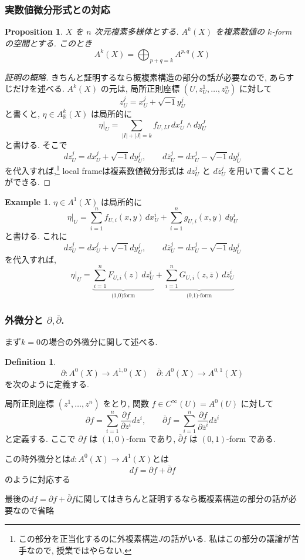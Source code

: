 \documentclass[dvipdfmx,a4paper,11pt]{article} %
\newtheorem{prop}[thm]{Proposition}
\theoremstyle{definition}
\newtheorem{defn}[thm]{Definition}
\newtheorem{example}[thm]{Example}
\theoremstyle{remark}
\numberwithin{equation}{section}
\begin{document}
\subsubsection{実数値微分形式との対応}

\begin{prop}
\(X\) を \(n\) 次元複素多様体とする. \(A^{k}(X)\) を複素数値の \(k\)-form の空間とする. このとき
\[
A^{k}(X) = \bigoplus_{p+q=k}A^{p,q}(X)
\]
\end{prop}
\begin{proof}[証明の概略]
きちんと証明するなら概複素構造の部分の話が必要なので, あらすじだけを述べる. \(A^{k}(X)\) の元は, 局所正則座標 \((U,z_U^1,\ldots,z_U^n)\) に対して
\[
z_U^j=x_U^j+\sqrt{-1}y_U^j
\]
と書くと, \(\eta\in A^k_{\mathbb{R}}(X)\) は局所的に
\[
\eta|_{U}=\sum_{|I|+|J|=k}f_{U,IJ}\,dx_U^I\wedge dy_U^J
\]
と書ける. そこで
\[
dz_U^j=dx_U^j+\sqrt{-1}dy_U^j,\qquad d\overline{z}_U^j=dx_U^j-\sqrt{-1}dy_U^j
\]
を代入すれば,\footnote{この部分を正当化するのに外複素構造$J$の話がいる. 私はこの部分の議論が苦手なので, 授業ではやらない. } local frameは複素数値微分形式は \(dz_U^j\) と \(d\overline{z}_U^j\) を用いて書くことができる.
\end{proof}
\begin{example}
\(\eta \in A^{1}(X)\) は局所的に
\[
\eta|_{U}=\sum_{i=1}^{n} f_{U,i}(x, y)\,dx^i_U + \sum_{i=1}^{n} g_{U,i}(x,y)\,dy^i_U 
\]
と書ける. これに
\[
dz_U^j=dx_U^j+\sqrt{-1}dy_U^j,\qquad d\overline{z}_U^j=dx_U^j-\sqrt{-1}dy_U^j
\]
を代入すれば,
\[
\eta|_{U}=\underbrace{\sum_{i=1}^{n} F_{U,i}(z)\,dz^i_U}_{\text{(1,0)form}} + 
\underbrace{\sum_{i=1}^{n} G_{U,i}(z,\overline{z})\,d\overline z_U^i}_{\text{(0,1)-form}}
\]
\end{example}


\subsubsection{外微分と \(\partial,\overline{\partial}\).}

まず$k=0$の場合の外微分に関して述べる.
\begin{defn}
$$
\partial : A^0(X) \to A^{1,0}(X) \quad 
\overline{\partial} : A^0(X) \to A^{0,1}(X)  
$$
を次のように定義する. 

局所正則座標 \((z^1,\ldots,z^n)\) をとり, 
 関数 \(f\in C^\infty(U)=A^0(U)\) に対して
\[
\partial f=\sum_{i=1}^n \frac{\partial f}{\partial z^i}dz^i,\qquad
\overline{\partial}f=\sum_{i=1}^n \frac{\partial f}{\partial \overline{z}^i}d\overline{z}^i
\]
と定義する. 
ここで \(\partial f\) は \((1,0)\)-form であり, \(\overline{\partial}f\) は \((0,1)\)-form である.

この時外微分とは$d: A^0(X) \to A^1(X)$とは
\[
df=\partial f+\overline{\partial}f
\]
のように対応する
\end{defn}
最後の$df=\partial f+\overline{\partial}f
$に関してはきちんと証明するなら概複素構造の部分の話が必要なので省略
\end{document}
